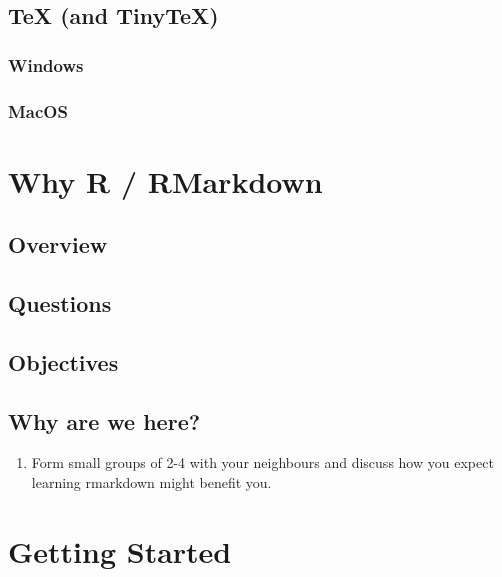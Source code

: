 \documentclass[]{article}
\providecommand{\tightlist}{%
  \setlength{\itemsep}{0pt}\setlength{\parskip}{0pt}}
\begin{document}
\hypertarget{tex-and-tinytex}{%
\subsection{TeX (and TinyTeX)}\label{tex-and-tinytex}}

\hypertarget{windows-3}{%
\subsubsection{Windows}\label{windows-3}}

\hypertarget{macos-3}{%
\subsubsection{MacOS}\label{macos-3}}

\hypertarget{why-r-rmarkdown}{%
\section{Why R / RMarkdown}\label{why-r-rmarkdown}}

\hypertarget{overview-1}{%
\subsection{Overview}\label{overview-1}}

\hypertarget{questions-1}{%
\subsection{Questions}\label{questions-1}}

\hypertarget{objectives}{%
\subsection{Objectives}\label{objectives}}

\hypertarget{why-are-we-here}{%
\subsection{Why are we here?}\label{why-are-we-here}}

\begin{enumerate}
\def\labelenumi{\arabic{enumi}.}
\tightlist
\item
  Form small groups of 2-4 with your neighbours and discuss how you
  expect learning rmarkdown might benefit you.
\end{enumerate}

\hypertarget{getting-started}{%
\section{Getting Started}\label{getting-started}}
\end{document}
